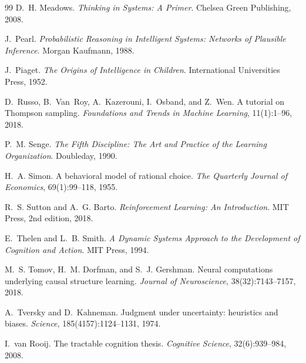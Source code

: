 \documentclass[11pt]{article}
\begin{document}
\begin{thebibliography}{99}
D.~H. Meadows.
\newblock \emph{Thinking in Systems: A Primer}.
\newblock Chelsea Green Publishing, 2008.

J.~Pearl.
\newblock \emph{Probabilistic Reasoning in Intelligent Systems: Networks of Plausible Inference}.
\newblock Morgan Kaufmann, 1988.

J.~Piaget.
\newblock \emph{The Origins of Intelligence in Children}.
\newblock International Universities Press, 1952.

D.~Russo, B.~Van~Roy, A.~Kazerouni, I.~Osband, and Z.~Wen.
\newblock A tutorial on {T}hompson sampling.
\newblock \emph{Foundations and Trends in Machine Learning}, 11(1):1--96, 2018.

P.~M. Senge.
\newblock \emph{The Fifth Discipline: The Art and Practice of the Learning Organization}.
\newblock Doubleday, 1990.

H.~A. Simon.
\newblock A behavioral model of rational choice.
\newblock \emph{The Quarterly Journal of Economics}, 69(1):99--118, 1955.

R.~S. Sutton and A.~G. Barto.
\newblock \emph{Reinforcement Learning: An Introduction}.
\newblock MIT Press, 2nd edition, 2018.

E.~Thelen and L.~B. Smith.
\newblock \emph{A Dynamic Systems Approach to the Development of Cognition and Action}.
\newblock MIT Press, 1994.

M.~S. Tomov, H.~M. Dorfman, and S.~J. Gershman.
\newblock Neural computations underlying causal structure learning.
\newblock \emph{Journal of Neuroscience}, 38(32):7143--7157, 2018.

A.~Tversky and D.~Kahneman.
\newblock Judgment under uncertainty: heuristics and biases.
\newblock \emph{Science}, 185(4157):1124--1131, 1974.

I.~van Rooij.
\newblock The tractable cognition thesis.
\newblock \emph{Cognitive Science}, 32(6):939--984, 2008.

\end{thebibliography}
\end{document}
